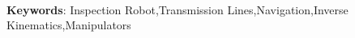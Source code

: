 \begin{thesisabastract}



\ \\

\textbf{Keywords}: Inspection Robot,Transmission Lines,Navigation,Inverse Kinematics,Manipulators

\end{thesisabastract}
